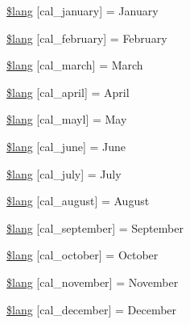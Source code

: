 \begin{DoxyCompactItemize}
\item 
\mbox{\hyperlink{calendar__lang_8php_a29fc67e0e18ded383ccb2fae4ed9500f}{\$lang}} \mbox{[}\textquotesingle{}cal\+\_\+january\textquotesingle{}\mbox{]} = \textquotesingle{}January\textquotesingle{}
\item 
\mbox{\hyperlink{calendar__lang_8php_afb865de49d3f598768ff91c4e6b1ad5e}{\$lang}} \mbox{[}\textquotesingle{}cal\+\_\+february\textquotesingle{}\mbox{]} = \textquotesingle{}February\textquotesingle{}
\item 
\mbox{\hyperlink{calendar__lang_8php_a67f59c410524d42bd0fd14fcc88a405d}{\$lang}} \mbox{[}\textquotesingle{}cal\+\_\+march\textquotesingle{}\mbox{]} = \textquotesingle{}March\textquotesingle{}
\item 
\mbox{\hyperlink{calendar__lang_8php_ae29241079b87997b56d455d06030fd86}{\$lang}} \mbox{[}\textquotesingle{}cal\+\_\+april\textquotesingle{}\mbox{]} = \textquotesingle{}April\textquotesingle{}
\item 
\mbox{\hyperlink{calendar__lang_8php_a55e9ba5a58cdf3e35a438cf34e8763fe}{\$lang}} \mbox{[}\textquotesingle{}cal\+\_\+mayl\textquotesingle{}\mbox{]} = \textquotesingle{}May\textquotesingle{}
\item 
\mbox{\hyperlink{calendar__lang_8php_a3f6453229450334d8382aeea241b59e8}{\$lang}} \mbox{[}\textquotesingle{}cal\+\_\+june\textquotesingle{}\mbox{]} = \textquotesingle{}June\textquotesingle{}
\item 
\mbox{\hyperlink{calendar__lang_8php_a0c0b25847c1eff06d6e70af1c1044cb8}{\$lang}} \mbox{[}\textquotesingle{}cal\+\_\+july\textquotesingle{}\mbox{]} = \textquotesingle{}July\textquotesingle{}
\item 
\mbox{\hyperlink{calendar__lang_8php_af3ec7453436342a22dc6ccc5f9362ee2}{\$lang}} \mbox{[}\textquotesingle{}cal\+\_\+august\textquotesingle{}\mbox{]} = \textquotesingle{}August\textquotesingle{}
\item 
\mbox{\hyperlink{calendar__lang_8php_aa82808fa4935db41b5ee6113311eb49e}{\$lang}} \mbox{[}\textquotesingle{}cal\+\_\+september\textquotesingle{}\mbox{]} = \textquotesingle{}September\textquotesingle{}
\item 
\mbox{\hyperlink{calendar__lang_8php_a0955be4cd71fdbc61cafb4fec3dba209}{\$lang}} \mbox{[}\textquotesingle{}cal\+\_\+october\textquotesingle{}\mbox{]} = \textquotesingle{}October\textquotesingle{}
\item 
\mbox{\hyperlink{calendar__lang_8php_a6b790e429102e42a4f44cfa3f3752b30}{\$lang}} \mbox{[}\textquotesingle{}cal\+\_\+november\textquotesingle{}\mbox{]} = \textquotesingle{}November\textquotesingle{}
\item 
\mbox{\hyperlink{calendar__lang_8php_a762006d627200bc070c299a5bbee2442}{\$lang}} \mbox{[}\textquotesingle{}cal\+\_\+december\textquotesingle{}\mbox{]} = \textquotesingle{}December\textquotesingle{}
\end{DoxyCompactItemize}


